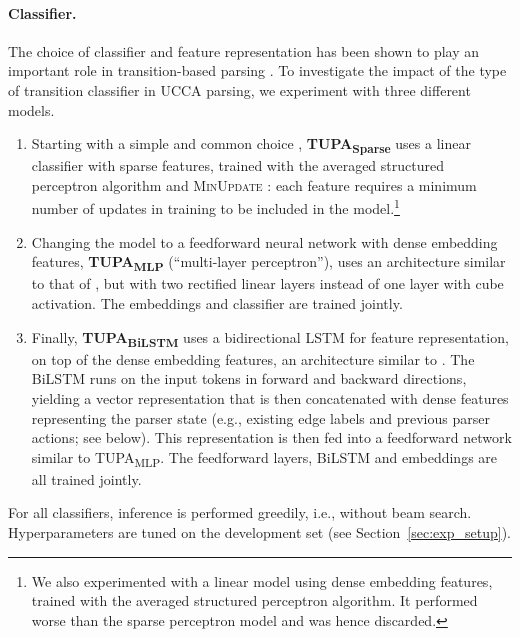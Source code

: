 \documentclass[11pt,a4paper]{article}
\newcommand{\parser}[1]{TUPA\textsubscript{#1}}
\newcommand{\secref}[1]{Section~\ref{#1}}
\begin{document}
\paragraph{Classifier.}
The choice of classifier and feature representation has been shown to play an important role in
transition-based parsing \cite{chen2014fast,andor2016globally,kiperwasser2016simple}.
To investigate the impact of the type of transition classifier in UCCA parsing,
we experiment with three different models.
\begin{enumerate}[leftmargin=*]
\item
Starting with a simple and common choice \cite[e.g.,][]{maier-lichte:2016:DiscoNLP},
\textbf{\parser{Sparse}} uses a linear classifier with sparse features, trained with
the averaged structured perceptron algorithm
\cite{Coll:04} and \textsc{MinUpdate} \cite{goldberg2011learning}:
each feature requires a minimum number of updates in training
to be included in the model.\footnote{We also experimented with a linear model using
dense embedding features, trained with the averaged structured perceptron algorithm.
It performed worse than the sparse perceptron model and was hence discarded.}
\item
Changing the model to a feedforward neural network with dense embedding features,
\textbf{\parser{MLP}}
(``multi-layer perceptron''), uses an architecture similar to that of \citet{chen2014fast},
but with two rectified linear layers instead of one layer with cube activation.
The embeddings and classifier are trained jointly.
\item
Finally, \textbf{\parser{BiLSTM}} uses a bidirectional LSTM for feature representation,
on top of the dense embedding features,
an architecture similar to \citet{kiperwasser2016simple}.
The BiLSTM runs on the input tokens in forward and backward directions,
yielding a vector representation that is then concatenated with dense features representing the
parser state (e.g., existing edge labels and previous parser actions; see below).
This representation is then fed into a feedforward network similar to \parser{MLP}.
The feedforward layers, BiLSTM and embeddings are all trained jointly.
\end{enumerate}

For all classifiers, inference is performed greedily, i.e., without beam search.
Hyperparameters are tuned on the development set (see \secref{sec:exp_setup}).
\end{document}
